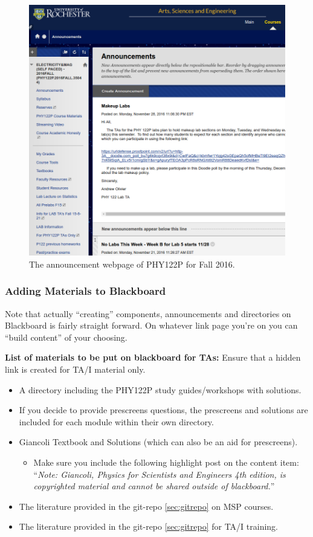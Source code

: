 \documentclass[12pt]{article}
\begin{document}
\begin{figure}[h]
  \centering
      \includegraphics[width=.8\textwidth]{Figures/BBAnnouncements.png}
  \caption{\protect\label{fig:egannouncement} The announcement webpage of PHY122P for Fall 2016.}
\end{figure}

\subsubsection{Adding Materials to Blackboard} \label{sec:bbres}

\indent Note that actually ``creating'' components, announcements and directories on Blackboard is fairly straight forward. On whatever link page you're on you can ``build content'' of your choosing. 

\noindent \textbf{List of materials to be put on blackboard for TAs:} Ensure that a hidden link is created for TA/I material only.

\begin{itemize}
	\item A directory including the PHY122P study guides/workshops with solutions.
	\item If you decide to provide prescreens questions, the prescreens and solutions are included for each module within their own directory.
	\item Giancoli Textbook and Solutions (which can also be an aid for prescreens).
		\begin{itemize}
			\item Make sure you include the following highlight post on the content item: ``\emph{Note: Giancoli, Physics for Scientists and Engineers 4th edition, is copyrighted material and cannot be shared outside of blackboard.}''
		\end{itemize}
	\item The literature provided in the git-repo \ref{sec:gitrepo} on MSP courses.
	\item The literature provided in the git-repo \ref{sec:gitrepo} for TA/I training.
\end{itemize}
\end{document}
